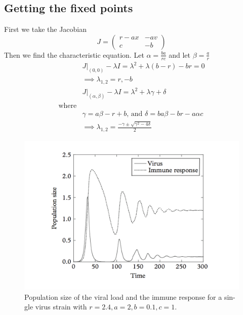 \documentclass{article}
\begin{document}
\subsection{Getting the fixed points}
First we take the Jacobian
\begin{equation}
    J =
    \begin{pmatrix}
        r-ax    & -av \\
        c       & -b
    \end{pmatrix}
\end{equation}
Then we find the characteristic equation. Let $\alpha = \frac{ba}{rc} $ and let $\beta = \frac{a}{r} $
\begin{equation}
    \begin{split}
        &J|_{(0,0)} - \lambda I = \lambda^2 + \lambda(b-r) -br = 0\\
        &\implies \lambda_{1,2} = r, -b \\
        &J|_{(\alpha,\beta)}  - \lambda I =  \lambda^2 + \lambda \gamma + \delta\\ 
        \text{where} \\
        &\gamma =  a\beta-r+b \text{, and } \delta =ba\beta -br-a\alpha c \\
        &\implies \lambda_{1,2} = \frac{-\gamma \pm \sqrt{\gamma^2 - 4\delta}}{2} 
    \end{split}
\end{equation}
    \begin{figure}[h!]
        \caption{Population size of the viral load and the immune response for a sin- gle virus strain with $r = 2.4, a = 2, b = 0.1, c = 1.$}
        \includegraphics[scale=.4]{imgs/hiv_graph1.png}
    \end{figure}
\end{document}
